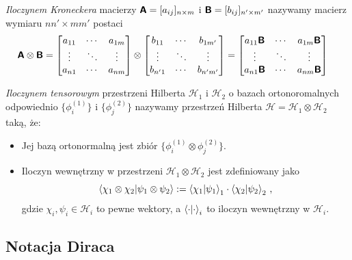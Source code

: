 \documentclass{myclass}
\begin{document}
\begin{definition}
\textit{Iloczynem Kroneckera} macierzy \(\boldsymbol{\mathsf{A}} = [a_{ij}]_{n\times m}\) i \(\boldsymbol{\mathsf{B}} =
[b_{ij}]_{n'\times m'}\) nazywamy macierz wymiaru \(nn'\times mm'\) postaci
\begin{equation*}
    \begin{split}
        \oper{A} \otimes \oper{B} &= \mqty[a_{11} & \cdots & a_{1m} \\ \vdots & \ddots & \vdots \\ a_{n1} & \cdots & a_{nm}] \otimes \mqty[b_{11} & \cdots & b_{1m'} \\ \vdots & \ddots & \vdots \\ b_{n'1} & \cdots & b_{n'm'}] = \mqty[a_{11}\oper{B} & \cdots & a_{1m}\oper{B} \\ \vdots & \ddots & \vdots \\ a_{n1}\oper{B} & \cdots & a_{nm}\oper{B}]
    \end{split}
\end{equation*}
\end{definition}

\begin{definition}
\textit{Iloczynem tensorowym} przestrzeni Hilberta \(\mathscr{H}_1\) i \(\mathscr{H}_2\) o bazach
ortonoromalnych odpowiednio \(\{\phi_i^{(1)}\}\) i \(\{\phi_j^{(2)}\}\) nazywamy przestrzeń Hilberta
\(\mathscr{H} = \mathscr{H}_1 \otimes \mathscr{H}_2\) taką, że:
\begin{itemize}
    
    \item Jej bazą ortonormalną jest zbiór \(\{\phi_i^{(1)} \otimes \phi_j^{(2)}\}\).

    \item Iloczyn wewnętrzny w przestrzeni \(\mathscr{H}_1 \otimes \mathscr{H}_2\) jest zdefiniowany
    jako
    \begin{equation*}
        \braket{\chi_1 \otimes \chi_2}{\psi_1 \otimes \psi_2} := \braket{\chi_1}{\psi_1}_1 \cdot \braket{\chi_2}{\psi_2}_2\,,
    \end{equation*}
    gdzie \(\chi_i,\psi_i \in \mathscr{H}_i\) to pewne wektory, a \(\braket{\cdot}_i\) to iloczyn
    wewnętrzny w \(\mathscr{H}_i\).
\end{itemize}
\end{definition}

\subsection{Notacja Diraca}
\end{document}
